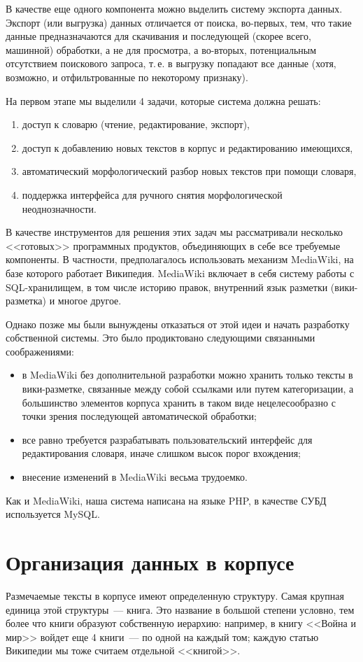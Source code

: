 \documentclass[a4paper]{article}
\begin{document}
В качестве еще одного компонента можно выделить систему экспорта данных. Экспорт (или выгрузка) данных отличается от поиска, во-первых, тем, что такие данные предназначаются для скачивания и последующей (скорее всего, машинной) обработки, а не для просмотра, а во-вторых, потенциальным отсутствием поискового запроса, т.\,е. в выгрузку попадают все данные (хотя, возможно, и отфильтрованные по некоторому признаку).

На первом этапе мы выделили 4 задачи, которые система должна решать:
\begin{enumerate}
\item доступ к словарю (чтение, редактирование, экспорт),
\item доступ к добавлению новых текстов в корпус и редактированию имеющихся,
\item автоматический морфологический разбор новых текстов при помощи словаря,
\item поддержка интерфейса для ручного снятия морфологической неоднозначности.
\end{enumerate}

В качестве инструментов для решения этих задач мы рассматривали несколько <<готовых>> программных продуктов, объединяющих в себе все требуемые компоненты. В частности, предполагалось использовать механизм MediaWiki, на базе которого работает Википедия.  MediaWiki включает в себя систему работы с SQL-хранилищем, в том числе историю правок, внутренний язык разметки (вики-разметка) и многое другое.

Однако позже мы были вынуждены отказаться от этой идеи и начать разработку собственной системы. Это было продиктовано следующими связанными соображениями:
\begin{itemize}
\item в MediaWiki без дополнительной разработки можно хранить только тексты в вики-разметке, связанные между собой ссылками или путем категоризации, а большинство элементов корпуса хранить в таком виде нецелесообразно с точки зрения последующей автоматической обработки;
\item все равно требуется разрабатывать пользовательский интерфейс для редактирования словаря, иначе слишком высок порог вхождения;
\item внесение изменений в MediaWiki весьма трудоемко.
\end{itemize}

Как и MediaWiki, наша система написана на языке PHP, в качестве СУБД используется MySQL.
\section{Организация данных в корпусе}
Размечаемые тексты в корпусе имеют определенную структуру. Самая крупная единица этой структуры~--- книга. Это название в большой степени условно, тем более что книги образуют собственную иерархию: например, в книгу <<Война и мир>> войдет еще 4 книги~--- по одной на каждый том; каждую статью Википедии мы тоже считаем отдельной <<книгой>>.
\end{document}
